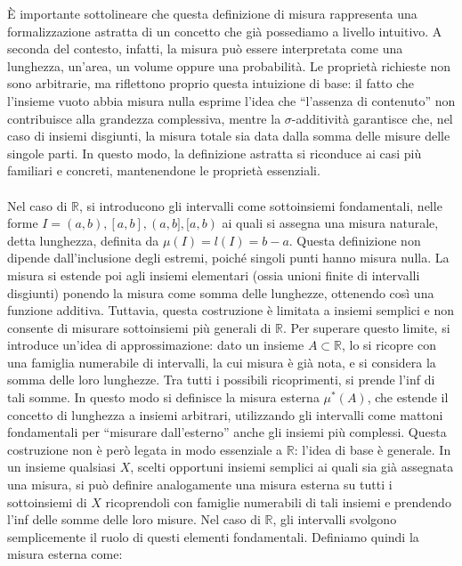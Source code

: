 \documentclass[a4paper,12pt]{report}
\begin{document}
\newpage

È importante sottolineare che questa definizione di misura rappresenta una formalizzazione astratta di un concetto che già possediamo a livello intuitivo. A seconda del contesto, infatti, la misura può essere interpretata come una lunghezza, un’area, un volume oppure una probabilità.
Le proprietà richieste non sono arbitrarie, ma riflettono proprio questa intuizione di base: il fatto che l’insieme vuoto abbia misura nulla esprime l’idea che “l’assenza di contenuto” non contribuisce alla grandezza complessiva, mentre la $\sigma$-additività garantisce che, nel caso di insiemi disgiunti, la misura totale sia data dalla somma delle misure delle singole parti. In questo modo, la definizione astratta si riconduce ai casi più familiari e concreti, mantenendone le proprietà essenziali.
\\
\\Nel caso di $\mathbb{R}$, si introducono gli intervalli come sottoinsiemi fondamentali, nelle forme $I=(a,b), [a,b],(a,b],[a,b)$ ai quali si assegna una misura naturale, detta lunghezza, definita da $\mu(I)=l(I)=b-a$. Questa definizione non dipende dall’inclusione degli estremi, poiché singoli punti hanno misura nulla. La misura si estende poi agli insiemi elementari (ossia unioni finite di intervalli disgiunti) ponendo la misura come somma delle lunghezze, ottenendo così una funzione additiva. Tuttavia, questa costruzione è limitata a insiemi semplici e non consente di misurare sottoinsiemi più generali di $\mathbb{R}$. Per superare questo limite, si introduce un’idea di approssimazione: dato un insieme $A \subset \mathbb{R}$, lo si ricopre con una famiglia numerabile di intervalli, la cui misura è già nota, e si considera la somma delle loro lunghezze. Tra tutti i possibili ricoprimenti, si prende l’inf di tali somme. In questo modo si definisce la misura esterna $\mu ^*(A)$, che estende il concetto di lunghezza a insiemi arbitrari, utilizzando gli intervalli come mattoni fondamentali per “misurare dall’esterno” anche gli insiemi più complessi.
Questa costruzione non è però legata in modo essenziale a $\mathbb{R}$: l’idea di base è generale. In un insieme qualsiasi $X$, scelti opportuni insiemi semplici ai quali sia già assegnata una misura, si può definire analogamente una misura esterna su tutti i sottoinsiemi di $X$ ricoprendoli con famiglie numerabili di tali insiemi e prendendo l’inf delle somme delle loro misure. Nel caso di $\mathbb{R}$, gli intervalli svolgono semplicemente il ruolo di questi elementi fondamentali. Definiamo quindi la misura esterna come:
\end{document}
